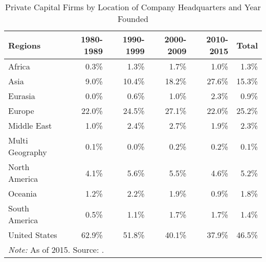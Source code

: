 
\begin{table}[ht]
    \caption{\label{tab:pcritablea1} Private Capital Firms by Location of Company Headquarters and Year Founded}\tabularnewline
    
    \begin{tabular}{lrrrrr}
        \toprule
        Regions & 1980-1989 & 1990-1999 & 2000-2009 & 2010-2015 & Total\tabularnewline
        \midrule
        Africa & 0.3\% & 1.3\% & 1.7\% & 1.0\% & 1.3\%\tabularnewline
        Asia & 9.0\% & 10.4\% & 18.2\% & 27.6\% & 15.3\%\tabularnewline
        Eurasia & 0.0\% & 0.6\% & 1.0\% & 2.3\% & 0.9\%\tabularnewline
        Europe & 22.0\% & 24.5\% & 27.1\% & 22.0\% & 25.2\%\tabularnewline
        Middle East & 1.0\% & 2.4\% & 2.7\% & 1.9\% & 2.3\%\tabularnewline
        Multi Geography & 0.1\% & 0.0\% & 0.2\% & 0.2\% & 0.1\%\tabularnewline
        North America & 4.1\% & 5.6\% & 5.5\% & 4.6\% & 5.2\%\tabularnewline
        Oceania & 1.2\% & 2.2\% & 1.9\% & 0.9\% & 1.8\%\tabularnewline
        South America & 0.5\% & 1.1\% & 1.7\% & 1.7\% & 1.4\%\tabularnewline
        United States & 62.9\% & 51.8\% & 40.1\% & 37.9\% & 46.5\%\tabularnewline
        \bottomrule
        \multicolumn{6}{l}{\textit{Note: } As of 2015. Source: \citet{jeng2015}.}\tabularnewline
    \end{tabular}
\end{table}